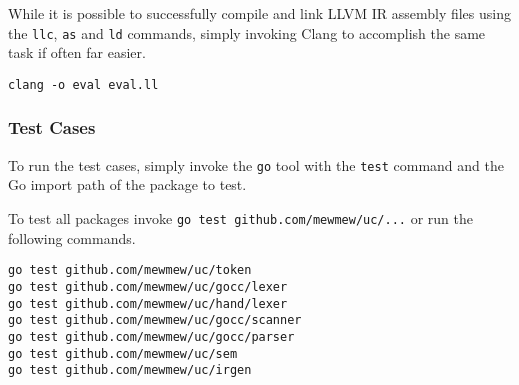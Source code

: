 While it is possible to successfully compile and link LLVM IR assembly files using the \texttt{llc}, \texttt{as} and \texttt{ld} commands, simply invoking Clang to accomplish the same task if often far easier.

\begin{verbatim}
clang -o eval eval.ll
\end{verbatim}

\subsubsection{Test Cases}

To run the test cases, simply invoke the \texttt{go} tool with the \texttt{test} command and the Go import path of the package to test.

To test all packages invoke \texttt{go test github.com/mewmew/uc/...} or run the following commands.

\begin{verbatim}
go test github.com/mewmew/uc/token
go test github.com/mewmew/uc/gocc/lexer
go test github.com/mewmew/uc/hand/lexer
go test github.com/mewmew/uc/gocc/scanner
go test github.com/mewmew/uc/gocc/parser
go test github.com/mewmew/uc/sem
go test github.com/mewmew/uc/irgen
\end{verbatim}
